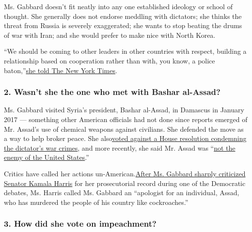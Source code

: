 Ms. Gabbard doesn't fit neatly into any one established ideology or
school of thought. She generally does not endorse meddling with
dictators; she thinks the threat from Russia is severely exaggerated;
she wants to stop beating the drums of war with Iran; and she would
prefer to make nice with North Korea.

``We should be coming to other leaders in other countries with respect,
building a relationship based on cooperation rather than with, you know,
a police
baton,''\href{https://www.nytimes.com/2019/08/02/us/politics/tulsi-gabbard-2020-presidential-race.html}{}\href{https://www.nytimes.com/2019/08/02/us/politics/tulsi-gabbard-2020-presidential-race.html}{she
told The New York Times}.

\hypertarget{2-wasnt-she-the-one-who-met-with-bashar-al-assad}{%
\subsubsection{\texorpdfstring{\textbf{2. Wasn't she the one who met
with Bashar
al-Assad?}}{2. Wasn't she the one who met with Bashar al-Assad?}}\label{2-wasnt-she-the-one-who-met-with-bashar-al-assad}}

Ms. Gabbard visited Syria's president, Bashar al-Assad, in Damascus in
January 2017 --- something other American officials had not done since
reports emerged of Mr. Assad's use of chemical weapons against
civilians. She defended the move as a way to help broker peace. She
also\href{https://www.congress.gov/bill/114th-congress/house-concurrent-resolution/121/text}{}\href{https://www.congress.gov/bill/114th-congress/house-concurrent-resolution/121/text}{voted
against a House resolution condemning the dictator's war crimes}, and
more recently, she said Mr. Assad was
``\href{https://www.msnbc.com/morning-joe/watch/rep-gabbard-assad-is-not-an-enemy-of-the-us-1438093891865}{not
the enemy of the United States}.''

Critics have called her actions
un-American.\href{https://www.nytimes.com/2019/07/31/us/politics/kamala-harris-prisoners-tulsi-gabbard.html?module=inline}{}\href{https://www.nytimes.com/2019/07/31/us/politics/kamala-harris-prisoners-tulsi-gabbard.html?module=inline}{After
Ms. Gabbard sharply criticized Senator Kamala Harris} for her
prosecutorial record during one of the Democratic debates, Ms. Harris
called Ms. Gabbard an ``apologist for an individual, Assad, who has
murdered the people of his country like cockroaches.''

\hypertarget{3-how-did-she-vote-on-impeachment}{%
\subsubsection{\texorpdfstring{\textbf{3. How did she vote on
impeachment?}}{3. How did she vote on impeachment?}}\label{3-how-did-she-vote-on-impeachment}}


